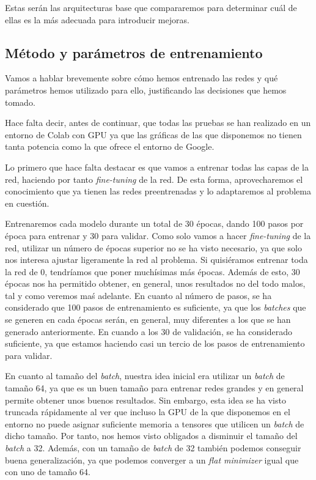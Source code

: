 \documentclass[11pt,a4paper]{article}
\begin{document}
Estas serán las arquitecturas base que compararemos para determinar cuál de ellas es la más adecuada
para introducir mejoras.

\subsection{Método y parámetros de entrenamiento}

Vamos a hablar brevemente sobre cómo hemos entrenado las redes y qué parámetros hemos utilizado para
ello, justificando las decisiones que hemos tomado.

Hace falta decir, antes de continuar, que todas las pruebas se han realizado en un entorno de Colab
con GPU ya que las gráficas de las que disponemos no tienen tanta potencia como la que ofrece el entorno
de Google.

Lo primero que hace falta destacar es que vamos a entrenar todas las capas de la red, haciendo por tanto
\textit{fine-tuning} de la red. De esta forma, aprovecharemos el conocimiento que ya tienen
las redes preentrenadas y lo adaptaremos al problema en cuestión.

Entrenaremos cada modelo durante un total de 30 épocas, dando 100 pasos por época para entrenar y 30 para validar.
Como solo vamos a hacer \textit{fine-tuning} de la red, utilizar un número de épocas superior no se ha visto
necesario, ya que solo nos interesa ajustar ligeramente la red al problema. Si quisiéramos entrenar toda la red
de 0, tendríamos que poner muchísimas más épocas. Además de esto, 30 épocas nos ha permitido obtener, en general,
unos resultados no del todo malos, tal y como veremos maś adelante. En cuanto al número de pasos, se ha considerado
que 100 pasos de entrenamiento es suficiente, ya que los \textit{batches} que se generen en cada épocas serán, en
general, muy diferentes a los que se han generado anteriormente. En cuando a los 30 de validación, se ha considerado
suficiente, ya que estamos haciendo casi un tercio de los pasos de entrenamiento para validar.

En cuanto al tamaño del \textit{batch}, nuestra idea inicial era utilizar un \textit{batch} de tamaño 64, ya
que es un buen tamaño para entrenar redes grandes y en general permite obtener unos buenos resultados. Sin
embargo, esta idea se ha visto truncada rápidamente al ver que incluso la GPU de la que disponemos en el
entorno no puede asignar suficiente memoria a tensores que utilicen un \textit{batch} de dicho tamaño. Por tanto,
nos hemos visto obligados a disminuir el tamaño del \textit{batch} a 32. Además, con un tamaño de \textit{batch}
de 32 también podemos conseguir buena generalización, ya que podemos converger a un \textit{flat minimizer} \cite{DBLP:journals/corr/KeskarMNST16} igual que con uno de tamaño 64.
\end{document}
